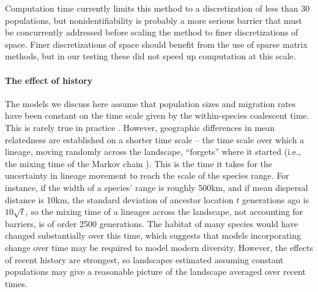 \documentclass{article}
\begin{document}
Computation time currently limits this method to a discretization of less than 30 populations,
but nonidentifiability is probably a more serious barrier that must be concurrently addressed
before scaling the method to finer discretizations of space. 
Finer discretizations of space should benefit from the use of sparse matrix methods,
but in our testing these did not speed up computation at this scale. 

\paragraph{The effect of history} 
The models we discuss here assume that population sizes and migration rates
have been constant on the time scale given by the within-species coalescent time.
This is rarely true in practice \citep{neigel1991estimation,barton1995genealogies}.
However, geographic differences in mean relatedness
are established on a shorter time scale --
the time scale over which a lineage, moving randomly across the landscape,
``forgets'' where it started
(i.e., the mixing time of the Markov chain \citep{wilkins2004separationoftimescales}).
This is the time it takes for the uncertainty in lineage movement
to reach the scale of the species range.
For instance,
if the width of a species' range is roughly 500km,
and if mean dispersal distance is 10km,
the standard deviation of ancestor location $t$ generations ago is $10\sqrt{t}$,
so the mixing time of a lineages across the landscape,
not accounting for barriers, is of order 2500 generations.
The habitat of many species would have changed substantially over this time, %
which suggests that models incorporating change over time 
may be required to model modern diversity.
However, the effects of recent history are strongest,
so landscapes estimated assuming constant populations
may give a reasonable picture of the landscape averaged over recent times.
\end{document}
